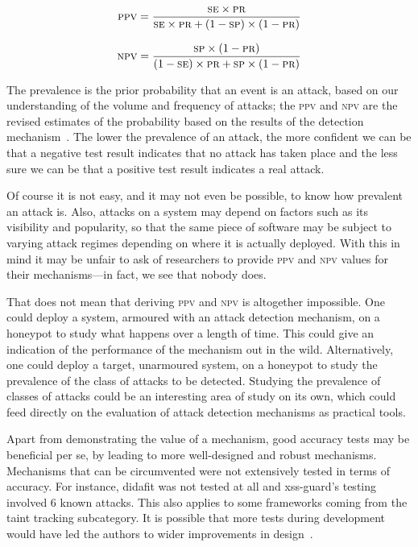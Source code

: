 \documentclass[conference]{IEEEtran}
\begin{document}
\begin{equation}
\textsc{ppv} = \frac{\textsc{se}\times \textsc{pr}}{
\textsc{se}\times \textsc{pr} + (1 - \textsc{sp})\times (1 -
\textsc{pr})}
\label{eq:ppv-se-sp}
\end{equation}

\begin{equation}
\textsc{npv} = \frac{\textsc{sp}\times (1 - \textsc{pr})}{
(1 - \textsc{se})\times \textsc{pr} + \textsc{sp}\times (1 -
\textsc{pr})}
\label{eq:npv-se-sp}
\end{equation}

\noindent
The prevalence is the prior probability that an event is an attack,
based on our understanding of the volume and frequency of attacks; the
\textsc{ppv} and \textsc{npv} are the revised estimates of the
probability based on the results of the detection
mechanism~\cite{altman1994}. The lower the prevalence of an attack,
the more confident we can be that a negative test result indicates
that no attack has taken place and the less sure we can be that a
positive test result indicates a real attack. 

Of course it is not easy, and it may not even be possible, to know how
prevalent an attack is. Also, attacks on a system may depend on
factors such as its visibility and popularity, so that the same piece
of software may be subject to varying attack regimes depending on
where it is actually deployed. With this in mind it may be unfair to
ask of researchers to provide \textsc{ppv} and \textsc{npv} values for
their mechanisms---in fact, we see that nobody does.

That does not mean that deriving \textsc{ppv} and \textsc{npv} is
altogether impossible. One could deploy a system, armoured with an
attack detection mechanism, on a honeypot to study what happens over
a length of time. This could give an indication of the performance of
the mechanism out in the wild. Alternatively, one could deploy a
target, unarmoured system, on a honeypot to study the prevalence of
the class of attacks to be detected. Studying the prevalence of
classes of attacks could be an interesting area of study on its own,
which could feed directly on the evaluation of attack detection
mechanisms as practical tools.

Apart from demonstrating the value of a mechanism, good accuracy tests
may be beneficial per se, by leading to more well-designed and robust
mechanisms. Mechanisms that can be circumvented were not extensively
tested in terms of accuracy. For instance, {\sc didafit} was not
tested at all and {\sc xss-guard}'s testing involved 6 known attacks.
This also applies to some frameworks coming from the taint tracking
subcategory. It is possible that more tests during development would
have led the authors to wider improvements in design~\cite{Van14}.
\end{document}
